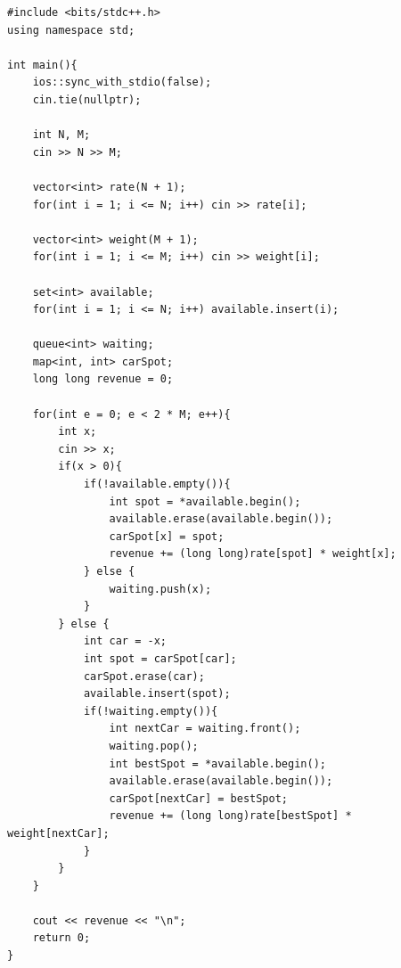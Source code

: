\documentclass[11pt,a4paper]{article}
\begin{document}
\begin{lstlisting}
#include <bits/stdc++.h>
using namespace std;

int main(){
    ios::sync_with_stdio(false);
    cin.tie(nullptr);

    int N, M;
    cin >> N >> M;

    vector<int> rate(N + 1);
    for(int i = 1; i <= N; i++) cin >> rate[i];

    vector<int> weight(M + 1);
    for(int i = 1; i <= M; i++) cin >> weight[i];

    set<int> available;
    for(int i = 1; i <= N; i++) available.insert(i);

    queue<int> waiting;
    map<int, int> carSpot;
    long long revenue = 0;

    for(int e = 0; e < 2 * M; e++){
        int x;
        cin >> x;
        if(x > 0){
            if(!available.empty()){
                int spot = *available.begin();
                available.erase(available.begin());
                carSpot[x] = spot;
                revenue += (long long)rate[spot] * weight[x];
            } else {
                waiting.push(x);
            }
        } else {
            int car = -x;
            int spot = carSpot[car];
            carSpot.erase(car);
            available.insert(spot);
            if(!waiting.empty()){
                int nextCar = waiting.front();
                waiting.pop();
                int bestSpot = *available.begin();
                available.erase(available.begin());
                carSpot[nextCar] = bestSpot;
                revenue += (long long)rate[bestSpot] * weight[nextCar];
            }
        }
    }

    cout << revenue << "\n";
    return 0;
}
\end{lstlisting}
\end{document}
